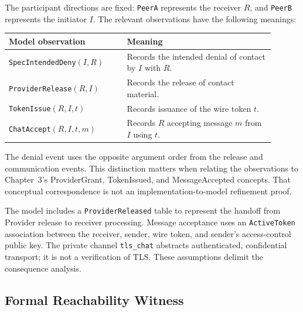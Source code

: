 The participant directions are fixed: \texttt{PeerA} represents the receiver
$R$, and \texttt{PeerB} represents the initiator $I$. The relevant observations
have the following meanings:
\begin{center}
\begin{tabular}{p{0.40\linewidth}p{0.50\linewidth}}
\hline
Model observation & Meaning \\
\hline
\texttt{SpecIntendedDeny}$(I,R)$ & Records the intended denial of contact by
$I$ with $R$. \\
\texttt{ProviderRelease}$(R,I)$ & Records the release of contact material. \\
\texttt{TokenIssue}$(R,I,t)$ & Records issuance of the wire token $t$. \\
\texttt{ChatAccept}$(R,I,t,m)$ & Records $R$ accepting message $m$ from $I$
using $t$. \\
\hline
\end{tabular}
\end{center}
The denial event uses the opposite argument order from the release and
communication events. This distinction matters when relating the observations
to Chapter~3's \textsf{ProviderGrant}, \textsf{TokenIssued}, and
\textsf{MessageAccepted} concepts. That conceptual correspondence is not an
implementation-to-model refinement proof.

The model includes a \texttt{ProviderReleased} table to represent the handoff
from Provider release to receiver processing. Message acceptance uses an
\texttt{ActiveToken} association between the receiver, sender, wire token,
and sender's access-control public key. The private channel
\texttt{tls\_chat} abstracts authenticated, confidential transport;
it is not a verification of TLS. These assumptions delimit the consequence
analysis.


\subsection{Formal Reachability Witness}

